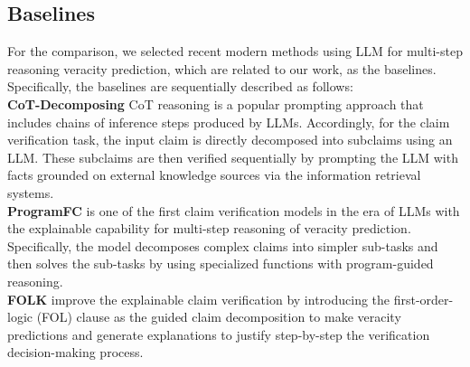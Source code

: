 \documentclass[11pt]{article}
\begin{document}
\subsection{Baselines}
For the comparison, we selected recent modern methods using LLM for multi-step reasoning veracity prediction, which are related to our work, as the baselines. Specifically, the baselines are sequentially described as follows:
\\
\textbf{CoT-Decomposing} CoT reasoning \cite{Wei0SBIXCLZ22} is a popular prompting approach that includes chains of inference steps produced by LLMs. Accordingly, for the claim verification task, the input claim is directly decomposed into subclaims using an LLM. These subclaims are then verified sequentially by prompting the LLM with facts grounded on external knowledge sources via the information retrieval systems. 
\\
\textbf{ProgramFC} \cite{program_fc} is one of the first claim verification models in the era of LLMs with the explainable capability for multi-step reasoning of veracity prediction. Specifically, the model decomposes complex claims into simpler sub-tasks and then solves the sub-tasks by using specialized functions with program-guided reasoning.
\\
\textbf{FOLK}  \cite{WangS23a} improve the explainable claim verification by introducing the first-order-logic (FOL) clause as the guided claim decomposition to make veracity predictions and generate explanations to justify step-by-step the verification decision-making process.
\end{document}
